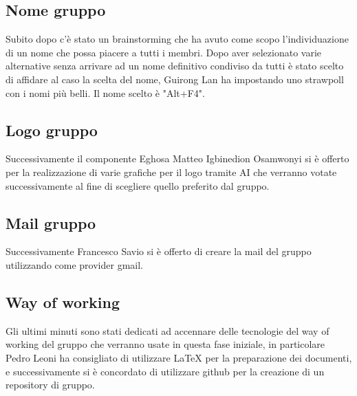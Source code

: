 \documentclass[a4paper, 12pt]{article}
\begin{document}
\subsection{Nome gruppo}
Subito dopo c'è stato un brainstorming che ha avuto come scopo l’individuazione di un nome che possa piacere a tutti i membri.
Dopo aver selezionato varie alternative senza arrivare ad un nome definitivo condiviso da tutti è stato scelto di affidare al caso la scelta del nome, Guirong Lan ha impostando uno strawpoll con i nomi più belli. Il nome scelto è "Alt+F4".


\subsection{Logo gruppo}
Successivamente il componente Eghosa Matteo Igbinedion Osamwonyi si è offerto per la realizzazione di varie grafiche per il logo tramite AI che verranno votate successivamente al fine di scegliere quello preferito dal gruppo.

\subsection{Mail gruppo}
Successivamente Francesco Savio si è offerto di creare la mail del gruppo utilizzando come provider gmail.

\subsection{Way of working}
Gli ultimi minuti sono stati dedicati ad accennare delle tecnologie del way of working del gruppo che verranno usate in questa fase iniziale, in particolare Pedro Leoni ha consigliato di utilizzare LaTeX per la preparazione dei documenti, e successivamente si è concordato di utilizzare github per la creazione di un repository di gruppo.
\end{document}
